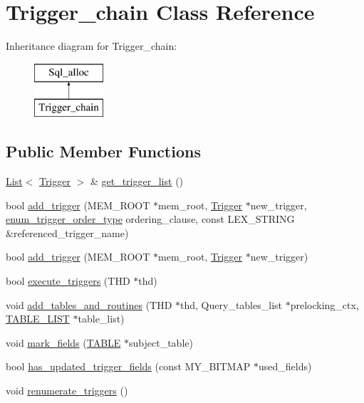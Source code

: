 \hypertarget{classTrigger__chain}{}\section{Trigger\+\_\+chain Class Reference}
\label{classTrigger__chain}
Inheritance diagram for Trigger\+\_\+chain\+:\begin{figure}[H]
\begin{center}
\leavevmode
\includegraphics[height=2.000000cm]{classTrigger__chain}
\end{center}
\end{figure}
\subsection*{Public Member Functions}
\begin{DoxyCompactItemize}
\item 
\mbox{\hyperlink{classList}{List}}$<$ \mbox{\hyperlink{classTrigger}{Trigger}} $>$ \& \mbox{\hyperlink{classTrigger__chain_a742711c61ef94fb62f01ddb3d9a59678}{get\+\_\+trigger\+\_\+list}} ()
\item 
bool \mbox{\hyperlink{classTrigger__chain_a86094bc6705c9066a62ca71cb3b41df2}{add\+\_\+trigger}} (M\+E\+M\+\_\+\+R\+O\+OT $\ast$mem\+\_\+root, \mbox{\hyperlink{classTrigger}{Trigger}} $\ast$new\+\_\+trigger, \mbox{\hyperlink{trigger__def_8h_a7bd30a5993310e0d23d906d26275bd08}{enum\+\_\+trigger\+\_\+order\+\_\+type}} ordering\+\_\+clause, const L\+E\+X\+\_\+\+S\+T\+R\+I\+NG \&referenced\+\_\+trigger\+\_\+name)
\item 
bool \mbox{\hyperlink{classTrigger__chain_ad4892d6b679218bfab53ed8c40528e1d}{add\+\_\+trigger}} (M\+E\+M\+\_\+\+R\+O\+OT $\ast$mem\+\_\+root, \mbox{\hyperlink{classTrigger}{Trigger}} $\ast$new\+\_\+trigger)
\item 
bool \mbox{\hyperlink{classTrigger__chain_aad870e1111c5318613bea0fcc36b1f27}{execute\+\_\+triggers}} (T\+HD $\ast$thd)
\item 
void \mbox{\hyperlink{classTrigger__chain_a49a317229cecbcab5d4ea5b24c47e8f2}{add\+\_\+tables\+\_\+and\+\_\+routines}} (T\+HD $\ast$thd, Query\+\_\+tables\+\_\+list $\ast$prelocking\+\_\+ctx, \mbox{\hyperlink{structTABLE__LIST}{T\+A\+B\+L\+E\+\_\+\+L\+I\+ST}} $\ast$table\+\_\+list)
\item 
void \mbox{\hyperlink{classTrigger__chain_ad54d622b2bff22f44fbeda41a79dccb8}{mark\+\_\+fields}} (\mbox{\hyperlink{structTABLE}{T\+A\+B\+LE}} $\ast$subject\+\_\+table)
\item 
bool \mbox{\hyperlink{classTrigger__chain_a3164d154777f1449b64f0460030163f8}{has\+\_\+updated\+\_\+trigger\+\_\+fields}} (const M\+Y\+\_\+\+B\+I\+T\+M\+AP $\ast$used\+\_\+fields)
\item 
void \mbox{\hyperlink{classTrigger__chain_aca447515b99afd1414d05bb7e83b249e}{renumerate\+\_\+triggers}} ()
\end{DoxyCompactItemize}

